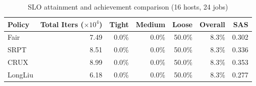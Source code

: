 \begin{table}[t]
\centering
\caption{SLO attainment and achievement comparison (16 hosts, 24 jobs)}
\label{tab:slo_16host}
\begin{tabular}{l|r|r|r|r|r|r}
\hline
Policy & Total Iters ($\times 10^4$) & Tight & Medium & Loose & Overall & SAS \\
\hline
Fair & 7.49 & 0.0\% & 0.0\% & 50.0\% & 8.3\% & 0.302 \\
SRPT & 8.51 & 0.0\% & 0.0\% & 50.0\% & 8.3\% & 0.336 \\
CRUX & 8.99 & 0.0\% & 0.0\% & 50.0\% & 8.3\% & 0.353 \\
LongLiu & 6.18 & 0.0\% & 0.0\% & 50.0\% & 8.3\% & 0.277 \\
\hline
\end{tabular}
\end{table}
